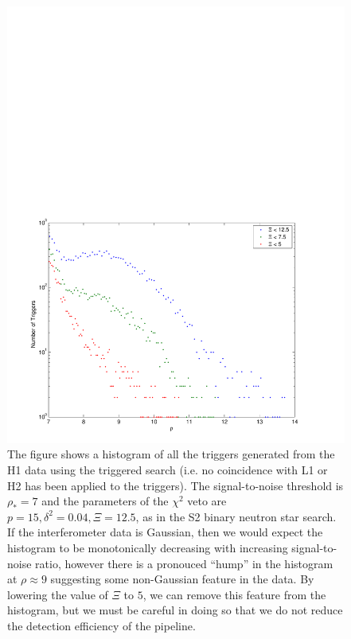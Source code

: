\begin{figure}[p]
\begin{center}
\includegraphics[width=\textwidth]{figures/result/h1l1_snr_hist_delta_0_04_chisq_12_5}
\end{center}
\caption[Tuning the $\chi^2$ Veto for H1]{%
\label{f:h1_chisq_tuning}%
The figure shows a histogram of all the triggers generated from the H1 data
using the triggered search (i.e. no coincidence with L1 or H2 has been applied
to the triggers). The signal-to-noise threshold is $\rho_\ast = 7$ and the
parameters of the $\chi^2$ veto are $p = 15, \delta^2 = 0.04, \Xi = 12.5$, as
in the S2 binary neutron star search. If the interferometer data is Gaussian,
then we would expect the histogram to be monotonically decreasing with
increasing signal-to-noise ratio, however there is a pronouced ``hump'' in the
histogram at $\rho\approx 9$ suggesting some non-Gaussian feature in the data.
By lowering the value of $\Xi$ to $5$, we can remove this feature from the
histogram, but we must be careful in doing so that we do not reduce the
detection efficiency of the pipeline.
}
\end{figure}

